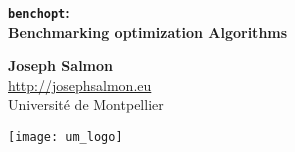 \documentclass[unknownkeysallowed]{beamer}
\begin{document}


\begin{frame}
\bigskip
\bigskip
\begin{center}{
\LARGE\color{marron}
\textbf{\texttt{benchopt}:\\
		Benchmarking optimization Algorithms}
\textbf{ }\\
\vspace{0.5cm}
}

\color{marron}
\end{center}

\vspace{0.5cm}

\begin{center}
\textbf{Joseph Salmon} \\
\vspace{0.1cm}
\url{http://josephsalmon.eu}\\
\vspace{0.5cm}
Université de Montpellier \\
\end{center}

\centering
\texttt{[image: um\_logo]}

\end{frame}







\end{document}
